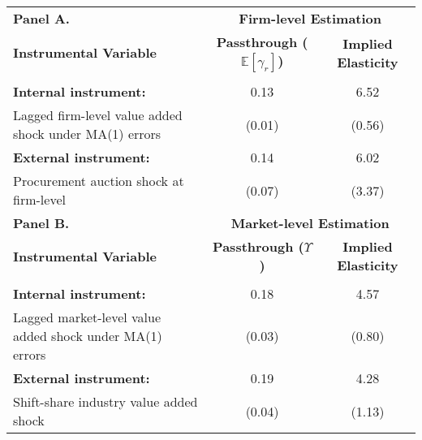 \begin{tabular}{lcc}
\toprule 
\midrule 
\textbf{Panel A.} & \multicolumn{2}{c}{\textbf{Firm-level Estimation}} \\
 \cmidrule(lr){2-3} 
\textbf{Instrumental Variable} & \textbf{Passthrough ($\mathbb{E}[\gamma_r]$)} & \textbf{Implied Elasticity} \\
\midrule \\[-8pt]
\textbf{Internal instrument: } & 0.13 & 6.52 \\[3pt]
Lagged firm-level value added shock under MA(1) errors & (0.01) & (0.56) \\[10pt]
\textbf{External instrument: } & 0.14 & 6.02 \\
Procurement auction shock at firm-level & (0.07) & (3.37) \\[6pt]
\midrule 
\textbf{Panel B.} & \multicolumn{2}{c}{\textbf{Market-level Estimation}} \\
 \cmidrule(lr){2-3} 
\textbf{Instrumental Variable} & \textbf{Passthrough ($\Upsilon$)} & \textbf{Implied Elasticity} \\
\midrule \\[-8pt]
\textbf{Internal instrument: } & 0.18 & 4.57 \\[3pt]
Lagged market-level value added shock under MA(1) errors & (0.03) & (0.80) \\[10pt]
\textbf{External instrument:} & 0.19 & 4.28 \\[3pt]
Shift-share industry value added shock & (0.04) & (1.13) \\[2pt]
\midrule 
\bottomrule 
\end{tabular}
